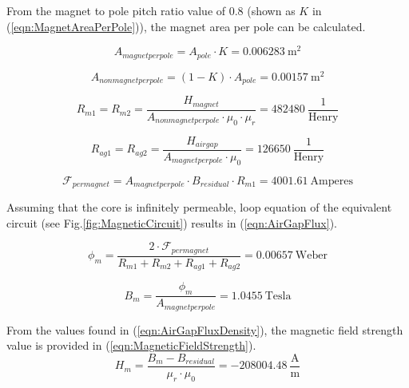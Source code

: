 \documentclass{article}
\begin{document}
\noindent From the magnet to pole pitch ratio value of 0.8 (shown as $K$ in (\ref{eqn:MagnetAreaPerPole})), the magnet area per pole can be calculated. 
\bigskip

\begin{equation} \label{eqn:MagnetAreaPerPole}
    A_{magnetperpole} = A_{pole}\cdot K = 0.006283 \: \mathrm{m^2}
\end{equation}

\begin{equation} \label{eqn:NonMagnetAreaPerPole}
    A_{nonmagnetperpole} = (1-K) \cdot A_{pole} = 0.00157 \: \mathrm{m^2}
\end{equation}

\begin{equation} \label{eqn:MagnetReluctance}
    R_{m1}  =  R_{m2} =  \frac{H_{magnet}}{A_{nonmagnetperpole} \cdot \mu_0 \cdot \mu_r}  = 482480 \: \mathrm{\frac{1}{Henry}} 
\end{equation}

\begin{equation} \label{eqn:MagnetReluctance}
    R_{ag1}  =  R_{ag2} =  \frac{H_{airgap}}{A_{magnetperpole} \cdot \mu_0}  =  126650  \: \mathrm{\frac{1}{Henry}} 
\end{equation}

\begin{equation} \label{eqn:MmfPerMagnet}
    \mathcal{F}_{permagnet} = A_{magnetperpole} \cdot B_{residual} \cdot R_{m1} = 4001.61 \: \mathrm{Amperes}
\end{equation}

\bigskip

\noindent Assuming that the core is infinitely permeable, loop equation of the equivalent circuit (see Fig.\ref{fig:MagneticCircuit}) results in (\ref{eqn:AirGapFlux}).
\bigskip

\begin{equation} \label{eqn:AirGapFlux}
    \phi_{m} = \frac{2 \cdot \mathcal{F}_{permagnet}}{R_{m1}+R_{m2}+R_{ag1}+R_{ag2}} = 0.00657 \: \mathrm{Weber}
\end{equation}

\begin{equation} \label{eqn:AirGapFluxDensity}
    B_{m} = \frac{\phi_{m}}{A_{magnetperpole}} = 1.0455 \: \mathrm{Tesla}
\end{equation}

\noindent From the values found in (\ref{eqn:AirGapFluxDensity}), the magnetic field strength value is provided in (\ref{eqn:MagneticFieldStrength}).
\begin{equation} \label{eqn:MagneticFieldStrength}
    H_m = \frac{B_m-B_{residual}}{\mu_r \cdot \mu_0} = -208004.48 \: \mathrm{\frac{A}{m}}
\end{equation}
\end{document}

